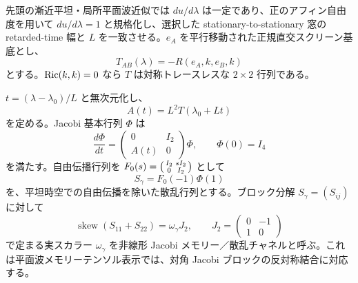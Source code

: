 先頭の漸近平坦・局所平面波近似では $du/d\lambda$ は一定であり、正のアフィン自由度を用いて $du/d\lambda=1$ と規格化し、選択した stationary-to-stationary 窓の retarded-time 幅と $L$ を一致させる。$e_A$ を平行移動された正規直交スクリーン基底とし、
\begin{equation}
T_{AB}(\lambda)=-R(e_A,k,e_B,k)
\label{eq:tidal}
\end{equation}
とする。$\operatorname{Ric}(k,k)=0$ なら $T$ は対称トレースレスな $2\times2$ 行列である。

$t=(\lambda-\lambda_0)/L$ と無次元化し、
\[
A(t)=L^2T(\lambda_0+Lt)
\]
を定める。Jacobi 基本行列 $\Phi$ は
\begin{equation}
\frac{d\Phi}{dt}=
\begin{pmatrix}0&I_2\\ A(t)&0\end{pmatrix}\Phi,
\qquad \Phi(0)=I_4
\label{eq:jacobi}
\end{equation}
を満たす。自由伝播行列を $F_0(s)=\begin{psmallmatrix}I_2&sI_2\\0&I_2\end{psmallmatrix}$ として
\begin{equation}
S_\gamma=F_0(-1)\Phi(1)
\label{eq:S}
\end{equation}
を、平坦時空での自由伝播を除いた散乱行列とする。ブロック分解 $S_\gamma=(S_{ij})$ に対して
\begin{equation}
\operatorname{skew}(S_{11}+S_{22})=\omega_\gamma J_2,
\qquad J_2=\begin{pmatrix}0&-1\\1&0\end{pmatrix}
\label{eq:omega-def}
\end{equation}
で定まる実スカラー $\omega_\gamma$ を非線形 Jacobi メモリー／散乱チャネルと呼ぶ。これは平面波メモリーテンソル表示では、対角 Jacobi ブロックの反対称結合に対応する\cite{Flanagan2020,Harte2025}。

